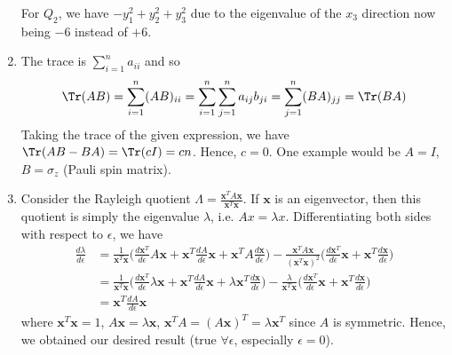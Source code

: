 \documentclass[a4paper]{article}
\begin{document}
\begin{ans}
\begin{enumerate}[label=(\alph*)]
For $Q_2$, we have $-y_1^2+y_2^2+y_3^2$ due to the eigenvalue of the $x_3$ direction now being $-6$ instead of $+6$.
\item The trace is $\sum_{i=1}^na_{ii}$ and so 
$$\Tr(AB)=\sum_{i=1}^n(AB)_{ii}=\sum_{i=1}^n\sum_{j=1}^na_{ij}b_{ji}=\sum_{j=1}^n(BA)_{jj}=\Tr(BA)$$
Taking the trace of the given expression, we have $\Tr(AB-BA)=\Tr(cI)=cn$. Hence, $c=0$. One example would be $A=I$, $B=\sigma_z$ (Pauli spin matrix).
\item Consider the Rayleigh quotient $\Lambda=\frac{\mathbf{x}^TA\mathbf{x}}{\mathbf{x}^T\mathbf{x}}$. If $\mathbf{x}$ is an eigenvector, then this quotient is simply the eigenvalue $\lambda$, i.e. $Ax=\lambda x$. Differentiating both sides with respect to $\epsilon$, we have
\begin{align}
\frac{d\lambda}{d\epsilon}&=\frac{1}{\mathbf{x}^T\mathbf{x}}\bigg(\frac{d\mathbf{x}^T}{d\epsilon}A\mathbf{x}+\mathbf{x}^T\frac{dA}{d\epsilon}\mathbf{x}+\mathbf{x}^TA\frac{d\mathbf{x}}{d\epsilon}\bigg)-\frac{\mathbf{x}^TA\mathbf{x}}{(\mathbf{x}^T\mathbf{x})^2}\bigg(\frac{d\mathbf{x}^T}{d\epsilon}\mathbf{x}+\mathbf{x}^T\frac{d\mathbf{x}}{d\epsilon}\bigg)\nonumber\\&=\frac{1}{\mathbf{x}^T\mathbf{x}}\bigg(\frac{d\mathbf{x}^T}{d\epsilon}\lambda\mathbf{x}+\mathbf{x}^T\frac{dA}{d\epsilon}\mathbf{x}+\lambda\mathbf{x}^T\frac{d\mathbf{x}}{d\epsilon}\bigg)-\frac{\lambda}{\mathbf{x}^T\mathbf{x}}\bigg(\frac{d\mathbf{x}^T}{d\epsilon}\mathbf{x}+\mathbf{x}^T\frac{d\mathbf{x}}{d\epsilon}\bigg)\nonumber\\&=\mathbf{x}^T\frac{dA}{d\epsilon}\mathbf{x}\nonumber
\end{align}
where $\mathbf{x}^T\mathbf{x}=1$, $A\mathbf{x}=\lambda\mathbf{x}$, $\mathbf{x}^TA=(A\mathbf{x})^T=\lambda\mathbf{x}^T$ since $A$ is symmetric. Hence, we obtained our desired result (true $\forall\epsilon$, especially $\epsilon=0$).
\end{enumerate}
\end{ans}
\newpage
\end{document}
